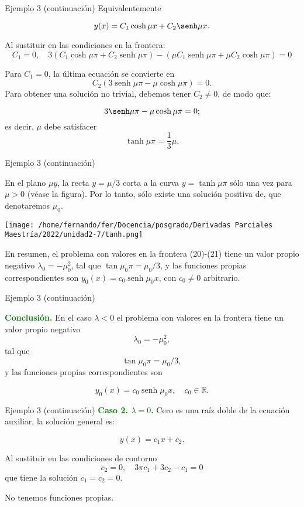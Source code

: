 \documentclass[xcolor=dvipsnames,a4paper,10pt,handout]{beamer}
\newcommand{\rr}{\mathbb{R}}
\renewcommand{\textbf}[1]{\textcolor{green}{\bfseries #1}}
\begin{document}
 

\begin{frame}{Ejemplo 3 (continuación)}
Equivalentemente 

$$y(x)=C_{1} \cosh \mu x+C_{2} \senh \mu x.$$

Al sustituir en las condiciones en la frontera:
$$
C_{1}=0, \quad 3\left(C_{1} \cosh \mu \pi+C_{2} \operatorname{senh} \mu \pi\right)-\left(\mu C_{1} \operatorname{senh} \mu \pi+\mu C_{2} \cosh \mu \pi\right)=0
$$

Para $C_{1}=0$, la última ecuación se convierte en
$$
C_{2}(3 \operatorname{senh} \mu \pi-\mu \cosh \mu \pi)=0 .
$$
Para obtener una solución no trivial, debemos tener $C_{2} \neq 0$, de modo que:

$$3 \senh \mu \pi-\mu\cosh \mu \pi=0;$$
es decir, $\mu$ debe satisfacer
 $$\tanh \mu \pi=\frac{1}{3} \mu.$$
 
 \end{frame}


 

\begin{frame}{Ejemplo 3 (continuación)}
 

En el plano $\mu y$, la recta $y=\mu / 3$ corta a la curva $y=\tanh \mu \pi$ sólo una vez para $\mu>0$ (véase la figura). Por lo tanto, sólo existe una solución positiva de, que denotaremos $\mu_{0}$.


\texttt{[image: /home/fernando/fer/Docencia/posgrado/Derivadas Parciales Maestría/2022/unidad2-7/tanh.png]}

En resumen, el problema con valores en la frontera (20)-(21) tiene un valor propio negativo $\lambda_{0}=-\mu_{0}^{2}$, tal que $\tan \mu_{0} \pi=\mu_{0} / 3$, y las funciones propias correspondientes son $y_{0}(x)=c_{0} \operatorname{senh} \mu_{0} x$, con $c_{0} \neq 0$ arbitrario.
\end{frame}


\begin{frame}{Ejemplo 3 (continuación)}
 

\textbf{Conclusión.} En el caso $\lambda<0$ el problema con valores en la frontera tiene un valor propio negativo 
$$\lambda_{0}=-\mu_{0}^{2},$$
tal que 
$$\tan \mu_{0} \pi=\mu_{0} / 3,$$
y las funciones propias correspondientes son 

$$y_{0}(x)=c_{0} \operatorname{senh} \mu_{0} x,\quad c_{0} \in\rr.$$ 

 \end{frame}


 

\begin{frame}{Ejemplo 3 (continuación)}
\textbf{Caso 2. $\lambda=0$.} Cero es una raíz doble de la ecuación auxiliar, la solución general es:

$$y(x)=c_{1} x+c_{2}.$$ 

Al sustituir en las condiciones de contorno
$$
c_{2}=0, \quad 3 \pi c_{1}+3 c_{2}-c_{1}=0
$$
que tiene la solución $c_{1}=c_{2}=0$. 

No tenemos funciones propias.
 \end{frame}
\end{document}
